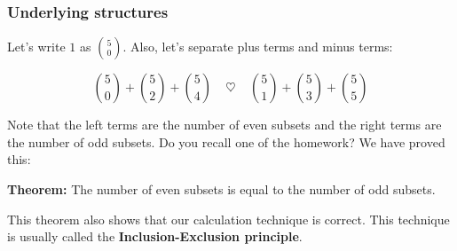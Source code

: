 \begin{frame}\frametitle{Underlying structures}
  Let's write $1$ as ${5\choose 0}$.  Also, let's separate plus terms
  and minus terms:

  $${5\choose 0} + {5\choose 2} + {5\choose 4}
  \ \ \ \ \ \heartsuit \ \ \ \ \
  {5\choose 1} + {5\choose 3} + {5\choose 5}$$

  \pause
  \vspace{0.1in}
  Note that the left terms are the number of even subsets and the
  right terms are the number of odd subsets.  Do you recall one of the
  homework? \pause We have proved this:

  \begin{tcolorbox}
    {\bf Theorem:} The number of even subsets is equal to the number
    of odd subsets.
  \end{tcolorbox}

  This theorem also shows that our calculation technique is correct.
  This technique is usually called the {\bf Inclusion-Exclusion
    principle}.
\end{frame}
